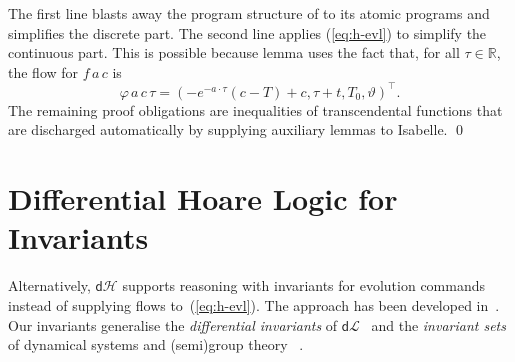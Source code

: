 \documentclass[envcountsame,envcountsect]{llncs}
\newcommand{\dL}{\mathsf{d}\mathcal{L}}
\newcommand{\dH}{\mathsf{d}\mathcal{H}}
\newcommand{\flow}{\varphi}
\newcommand{\reals}{\mathbb{R}}
\begin{document}
\begin{example}
The first line blasts away the program structure of
 to its atomic programs and simplifies the discrete part.  The second line applies (\ref{eq:h-evl}) to simplify the continuous part. This is
possible because lemma
uses the fact that, for all $\tau\in\reals$, the flow for $f\, a\, c$ is
\begin{equation*}
\flow\, a\, c\, \tau = (-e^{-a\cdot\tau}(c-T)+c, \tau+t, T_0, \vartheta)^\top.
\end{equation*}
The remaining proof obligations are
inequalities of transcendental functions that are discharged
automatically by supplying auxiliary lemmas to Isabelle. \qed
\end{example}



\section{Differential Hoare Logic for Invariants}\label{sec:hoare-inv}

Alternatively, $\dH$ supports reasoning with invariants for evolution
commands instead of supplying flows to~(\ref{eq:h-evl}).  The approach
has been developed in~\cite{MuniveS19}. Our invariants generalise the
\emph{differential invariants} of $\dL$~\cite{Platzer18} and the
\emph{invariant sets} of dynamical systems and (semi)group
theory~\cite{Teschl12} .
\end{document}
